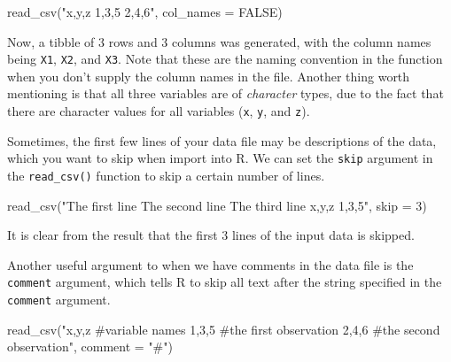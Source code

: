 \documentclass[
]{book}
\newenvironment{Shaded}{\begin{snugshade}}{\end{snugshade}}
\newcommand{\AttributeTok}[1]{\textcolor[rgb]{0.77,0.63,0.00}{#1}}
\newcommand{\ConstantTok}[1]{\textcolor[rgb]{0.00,0.00,0.00}{#1}}
\newcommand{\DecValTok}[1]{\textcolor[rgb]{0.00,0.00,0.81}{#1}}
\newcommand{\FunctionTok}[1]{\textcolor[rgb]{0.00,0.00,0.00}{#1}}
\newcommand{\NormalTok}[1]{#1}
\newcommand{\StringTok}[1]{\textcolor[rgb]{0.31,0.60,0.02}{#1}}
\begin{document}
\begin{Shaded}
\begin{Highlighting}[]
\FunctionTok{read\_csv}\NormalTok{(}\StringTok{"x,y,z}
\StringTok{          1,3,5}
\StringTok{          2,4,6"}\NormalTok{, }\AttributeTok{col\_names =} \ConstantTok{FALSE}\NormalTok{)}
\end{Highlighting}
\end{Shaded}

Now, a tibble of 3 rows and 3 columns was generated, with the column names being \texttt{X1}, \texttt{X2}, and \texttt{X3}. Note that these are the naming convention in the function when you don't supply the column names in the file. Another thing worth mentioning is that all three variables are of \emph{character} types, due to the fact that there are character values for all variables (\texttt{x}, \texttt{y}, and \texttt{z}).

Sometimes, the first few lines of your data file may be descriptions of the data, which you want to skip when import into R. We can set the \texttt{skip} argument in the \texttt{read\_csv()} function to skip a certain number of lines.

\begin{Shaded}
\begin{Highlighting}[]
\FunctionTok{read\_csv}\NormalTok{(}\StringTok{"The first line }
\StringTok{          The second line}
\StringTok{          The third line}
\StringTok{          x,y,z}
\StringTok{          1,3,5"}\NormalTok{, }\AttributeTok{skip =} \DecValTok{3}\NormalTok{)}
\end{Highlighting}
\end{Shaded}

It is clear from the result that the first 3 lines of the input data is skipped.

Another useful argument to when we have comments in the data file is the \texttt{comment} argument, which tells R to skip all text after the string specified in the \texttt{comment} argument.

\begin{Shaded}
\begin{Highlighting}[]
\FunctionTok{read\_csv}\NormalTok{(}\StringTok{"x,y,z \#variable names}
\StringTok{         1,3,5 \#the first observation}
\StringTok{         2,4,6 \#the second observation"}\NormalTok{, }\AttributeTok{comment =} \StringTok{"\#"}\NormalTok{)}
\end{Highlighting}
\end{Shaded}
\end{document}
